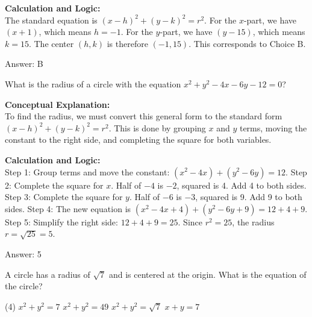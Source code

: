 \documentclass[11pt,paper=a4,answers]{exam}
\begin{document}
\begin{questions}
\begin{solution}
\textbf{Calculation and Logic:} \\
The standard equation is $(x - h)^2 + (y - k)^2 = r^2$. For the $x$-part, we have $(x + 1)$, which means $h = -1$. For the $y$-part, we have $(y - 15)$, which means $k = 15$. The center $(h, k)$ is therefore $(-1, 15)$. This corresponds to Choice B.

\vspace{30pt}

Answer: \colorbox{yellow!100}{B}
\end{solution}

\vspace{60pt}

\question
What is the radius of a circle with the equation $x^2 + y^2 - 4x - 6y - 12 = 0$?

\begin{solution}
\textbf{Conceptual Explanation:} \\
To find the radius, we must convert this general form to the standard form $(x - h)^2 + (y - k)^2 = r^2$. This is done by grouping $x$ and $y$ terms, moving the constant to the right side, and completing the square for both variables.

\vspace{30pt}

\textbf{Calculation and Logic:} \\
Step 1: Group terms and move the constant: $(x^2 - 4x) + (y^2 - 6y) = 12$. Step 2: Complete the square for $x$. Half of $-4$ is $-2$, squared is 4. Add 4 to both sides. Step 3: Complete the square for $y$. Half of $-6$ is $-3$, squared is 9. Add 9 to both sides. Step 4: The new equation is $(x^2 - 4x + 4) + (y^2 - 6y + 9) = 12 + 4 + 9$. Step 5: Simplify the right side: $12 + 4 + 9 = 25$. Since $r^2 = 25$, the radius $r = \sqrt{25} = 5$.

\vspace{30pt}

Answer: \colorbox{yellow!100}{5}
\end{solution}

\vspace{60pt}

\question
A circle has a radius of $\sqrt{7}$ and is centered at the origin. What is the equation of the circle?
\begin{tasks}(4)
    \task $x^2 + y^2 = 7$
    \task $x^2 + y^2 = 49$
    \task $x^2 + y^2 = \sqrt{7}$
    \task $x + y = 7$
\end{tasks}


\end{questions}
\end{document}
